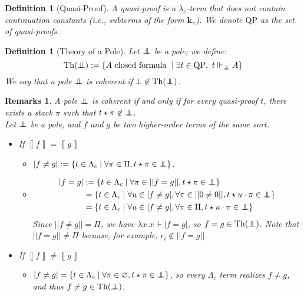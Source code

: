 \documentclass[a4paper,12pt]{article}
\newtheorem{defi}[theo]{Definition}
\theoremstyle{rmqstyle}
\newtheorem{rmqs}[theo]{Remarks}
\newcommand{\set}[1]{\{#1\}}
\newcommand{\abs}[1]{\lvert#1\rvert}
\newcommand{\abss}[1]{\lvert \lvert#1\rvert \rvert}
\newcommand{\itp}[1]{\left\llbracket#1\right\rrbracket}
\newcommand{\QP}{\mathrm{QP}}
\renewcommand{\k}{\mathbf{k}}
\newcommand{\pole}{{\protect\mathpalette{\protect\polehelper}{\bot}}} \def\polehelper#1#2{\mathrel{\rlap{$#1#2$}\mkern3mu{#1#2}}}
\newcommand{\Th}{\mathrm{Th}}
\begin{document}
\begin{defi}[Quasi-Proof]
A quasi-proof is a $\lambda_c$-term that does not contain continuation constants (i.e., subterms of the form $\k_\pi$). We denote $\QP$ as the set of quasi-proofs.
\end{defi}

\begin{defi}[Theory of a Pole]
Let $\pole$ be a pole; we define:
$$ \Th(\pole) := \set{ A \text{ closed formula } \mid \exists t \in \QP, \ t \Vdash_\pole A }$$
We say that a pole $\pole$ is coherent if $\bot \not \in \Th(\pole)$.
\end{defi}

\begin{rmqs}\label{R1} 
A pole $\pole$ is coherent if and only if for every quasi-proof $t$, there exists a stack $\pi$ such that $t \star \pi \not \in \pole$.\\
Let $\pole$ be a pole, and $f$ and $g$ be two higher-order terms of the same sort.
\begin{itemize}
\setlength\itemsep{ -1 em}
\item If $\itp{f} = \itp{g}$
\begin{itemize}
\setlength\itemsep{ -1 em}
\item $\abs{f \neq g} := \set{ t \in \Lambda_c \mid \forall \pi \in \Pi, t \star \pi \in \pole}$.\\
\item \begin{align*}
\abs{f = g} &:= \set{ t \in \Lambda_c \mid \forall \pi \in \abss{f = g}, t \star \pi \in \pole}\\
&= \set{ t \in \Lambda_c \mid \forall u \in \abs{f \neq g}, \forall \pi \in \abss{0 \neq 0}, t \star u \cdot \pi \in \pole}\\
&= \set{ t \in \Lambda_c \mid \forall u \in \abs{f \neq g}, \forall \pi \in \Pi, t \star u \cdot \pi \in \pole}
\end{align*}
Since $\abss{f \neq g} = \Pi$, we have $\lambda x.x \Vdash \abs{f = g}$, so $f = g \in \Th(\pole)$. Note that $\abss{f = g} \neq \Pi$ because, for example, $\epsilon_i \not \in \abss{f = g}$.
\end{itemize}
\item If $\itp{f} \neq \itp{g}$
\begin{itemize}
\setlength\itemsep{ -1 em}
\item $\abs{f \neq g} = \set{ t \in \Lambda_c \mid \forall \pi \in \varnothing, t \star \pi \in \pole}$, so every $\Lambda_c$ term realizes $f \neq g$, and thus $f \neq g \in \Th(\pole)$.\\

\end{itemize}
\end{itemize}
\end{rmqs}
\end{document}
